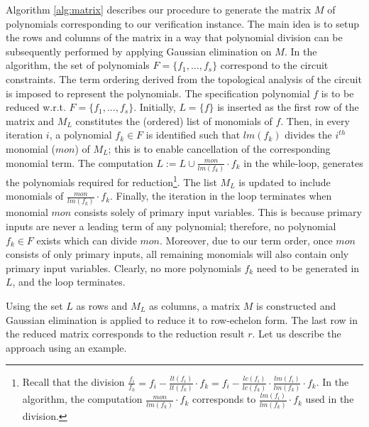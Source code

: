 Algorithm \ref{alg:matrix} describes our procedure to generate the
matrix $M$ of polynomials corresponding to our verification instance. 
The main idea  is to setup the rows  and columns of the matrix in a
way that polynomial division can be subsequently performed by
applying Gaussian elimination on $M$. 
In the algorithm, the set of polynomials $F = \{f_1, \dots, f_s\}$ 
correspond to the circuit constraints. The term ordering derived from
the topological analysis of the circuit is imposed to represent the
polynomials. The specification polynomial $f$ is to be reduced
w.r.t. $F= \{f_1, \dots, f_s\}$. Initially, $L = \{f\}$ is inserted as
the first row of the matrix and $M_L$ constitutes the (ordered) list
of monomials of $f$. Then, in every iteration $i$, a polynomial $f_k \in
F$ is identified such that $lm(f_k)$ divides the $i^{th}$ monomial
($mon$) of $M_L$; this is to enable cancellation of the corresponding
monomial term. The computation $L:=L \cup \frac{mon}{lm(f_{k})}\cdot
f_{k}$ in the while-loop, generates the polynomials required for
reduction\footnote{Recall that the division $\frac{f_i}{f_k} = f_i -
  \frac{lt(f_i)}{lt(f_{k})}\cdot f_{k} = f_i - \frac{lc(f_i)}{lc(f_k)} \cdot
  \frac{lm(f_i)}{lm(f_k)}\cdot f_k$. In the algorithm, the computation
  $\frac{mon}{lm(f_{k})}\cdot f_{k}$ corresponds to
  $\frac{lm(f_i)}{lm(f_k)}\cdot f_k$ used in the division.}.  
The list $M_L$ is updated to include monomials of
$\frac{mon}{lm(f_{k})}\cdot f_{k}$. Finally, the iteration in the
loop terminates when monomial $mon$ consists solely of primary input
variables. This is because primary inputs are never a leading term of
any polynomial; therefore, no polynomial $f_k \in F$ exists which can
divide $mon$. Moreover, due to our term order, once $mon$ consists of
only primary inputs, all remaining monomials will also contain 
only primary input variables. Clearly, no more polynomials $f_k$ need
to be generated in $L$, and the loop terminates. 

Using the set $L$ as rows and $M_L$ as columns, a matrix $M$ is
constructed and Gaussian elimination is applied to reduce it to
row-echelon form. The last row in the reduced matrix 
corresponds to the reduction result $r$. 
Let us describe the approach using an example.


